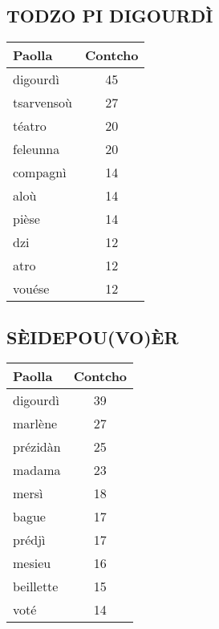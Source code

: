 \begin{minipage}{0.48\textwidth}
\subsection*{TODZO PI DIGOURDÌ}
\begin{tabular}{lc}
\toprule
\textbf{Paolla} & \textbf{Contcho} \\
\midrule
digourdì & 45 \\
tsarvensoù & 27 \\
téatro & 20 \\
feleunna & 20 \\
compagnì & 14 \\
aloù & 14 \\
pièse & 14 \\
dzi & 12 \\
atro & 12 \\
vouése & 12 \\
\bottomrule
\end{tabular}
\end{minipage}

\vspace{1em}
\begin{minipage}{0.48\textwidth}
\subsection*{SÈIDEPOU(VO)ÈR}
\begin{tabular}{lc}
\toprule
\textbf{Paolla} & \textbf{Contcho} \\
\midrule
digourdì & 39 \\
marlène & 27 \\
prézidàn & 25 \\
madama & 23 \\
mersì & 18 \\
bague & 17 \\
prédjì & 17 \\
mesieu & 16 \\
beillette & 15 \\
voté & 14 \\
\bottomrule
\end{tabular}
\end{minipage}
\hfill






\vspace{1em}

\newpage
